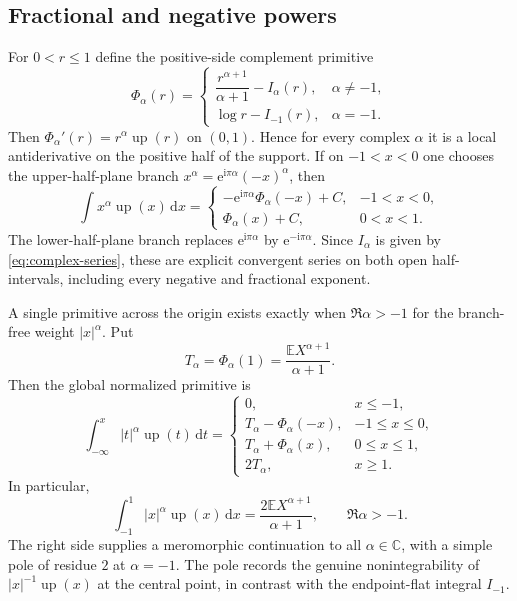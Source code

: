 \documentclass[11pt,oneside]{article}
\numberwithin{equation}{section}
\theoremstyle{definition}
\theoremstyle{remark}
\newcommand{\C}{\mathbb C}
\newcommand{\E}{\mathbb E}
\newcommand{\Up}{\operatorname{up}}
\newcommand{\e}{\mathrm e}
\newcommand{\ii}{\mathrm i}
\newcommand{\dd}{\,\mathrm d}
\begin{document}
\subsection{Fractional and negative powers}
For $0<r\le1$ define the positive-side complement primitive
\begin{equation}
 \Phi_\alpha(r)=
 \begin{cases}
 \dfrac{r^{\alpha+1}}{\alpha+1}-I_\alpha(r),&\alpha\ne-1,\\[7pt]
 \log r-I_{-1}(r),&\alpha=-1.
 \end{cases}                                               \label{eq:Phi-alpha}
\end{equation}
Then $\Phi_\alpha'(r)=r^\alpha\Up(r)$ on $(0,1)$.  Hence for every complex
$\alpha$ it is a local antiderivative on the positive half of the support.  If
on $-1<x<0$ one chooses the upper-half-plane branch
$x^\alpha=\e^{\ii\pi\alpha}(-x)^\alpha$, then
\begin{equation}
 \boxed{
 \int x^\alpha\Up(x)\dd x=
 \begin{cases}
 -\e^{\ii\pi\alpha}\Phi_\alpha(-x)+C,&-1<x<0,\\[3pt]
 \Phi_\alpha(x)+C,&0<x<1.
 \end{cases}}                                             \label{eq:up-complex-local}
\end{equation}
The lower-half-plane branch replaces $\e^{\ii\pi\alpha}$ by
$\e^{-\ii\pi\alpha}$.  Since $I_\alpha$ is given by
\eqref{eq:complex-series}, these are explicit convergent series on both open
half-intervals, including every negative and fractional exponent.

A single primitive across the origin exists exactly when $\Re\alpha>-1$ for
the branch-free weight $|x|^\alpha$.  Put
\begin{equation}
 T_\alpha=\Phi_\alpha(1)
 =\frac{\E X^{\alpha+1}}{\alpha+1}.                       \label{eq:T-alpha}
\end{equation}
Then the global normalized primitive is
\begin{equation}
 \boxed{
 \int_{-\infty}^{x}|t|^\alpha\Up(t)\dd t=
 \begin{cases}
 0,&x\le-1,\\
 T_\alpha-\Phi_\alpha(-x),&-1\le x\le0,\\
 T_\alpha+\Phi_\alpha(x),&0\le x\le1,\\
 2T_\alpha,&x\ge1.
 \end{cases}}                                             \label{eq:up-absolute-primitive}
\end{equation}
In particular,
\begin{equation}
 \boxed{
 \int_{-1}^{1}|x|^\alpha\Up(x)\dd x
 =\frac{2\E X^{\alpha+1}}{\alpha+1},\qquad \Re\alpha>-1.} \label{eq:up-fractional-moment}
\end{equation}
The right side supplies a meromorphic continuation to all $\alpha\in\C$, with
a simple pole of residue $2$ at $\alpha=-1$.  The pole records the genuine
nonintegrability of $|x|^{-1}\Up(x)$ at the central point, in contrast with
the endpoint-flat integral $I_{-1}$.
\end{document}
